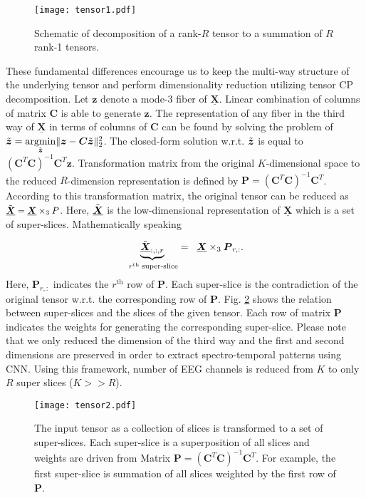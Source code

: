 \documentclass{article}
\begin{document}
\begin{figure}[b]
\vspace{-2mm}
\centerline{\texttt{[image: tensor1.pdf]}}
\caption{\small{Schematic of decomposition of a rank-$R$ tensor to a summation of $R$ rank-1 tensors.}}
\label{fig:tensor11}
\vspace{-3mm}
\end{figure}
These fundamental differences encourage us to keep the multi-way structure of the underlying tensor and perform  dimensionality reduction utilizing tensor CP decomposition. Let $\boldsymbol{z}$ denote a mode-3 fiber  of $\underline{\boldsymbol{X}}$. Linear combination of columns of matrix $\boldsymbol{C}$ is able to generate $\boldsymbol{z}$.  
The  representation of any fiber in the third way of $\underline{\boldsymbol{X}}$ in terms of columns of $\boldsymbol{C}$ can be found by solving the 
problem of
   $\Tilde{\boldsymbol{z}}=\underset{\Tilde{\boldsymbol{z}}}{\text{argmin}}\|\boldsymbol{z}-\boldsymbol{C}\Tilde{\boldsymbol{z}}\|_2^2$.
The closed-form solution w.r.t. $\Tilde{\boldsymbol{z}}$ is equal to $(\boldsymbol{C}^T\boldsymbol{C})^{-1}\boldsymbol{C}^T\boldsymbol{z}$. 
Transformation matrix from the original $K$-dimensional space to the reduced $R$-dimension representation is defined by $\boldsymbol{P}=(\boldsymbol{C}^T\boldsymbol{C})^{-1}\boldsymbol{C}^T$. According to this transformation matrix, the original tensor can be reduced as
 $\small{\Tilde{\boldsymbol{\underline{X}}}=\underline{\boldsymbol{X}}\times_3 P}$.
Here, $\Tilde{\boldsymbol{\underline{X}}}$ is the low-dimensional representation of $\boldsymbol{\underline{X}}$ which is a set of super-slices. Mathematically speaking


 $$\underbrace{\Tilde{\underline{\boldsymbol{X}}}_{:,:,r}}_{\;r^{\text{th}} \;\text{super-slice}}=\;\;\underline{\boldsymbol{\boldsymbol{X}}}\times_3 \boldsymbol{P}_{r,:}. $$ 
Here, $\boldsymbol{P}_{r,:}$ indicates the $r^{\text{th}}$ row of $\boldsymbol{P}$. Each super-slice is the contradiction of the original tensor w.r.t. the corresponding row of $ \boldsymbol{P}$.  Fig. \ref{fig:tensor22} shows the relation between super-slices and the slices of the given tensor. Each row of matrix $\boldsymbol{P}$ indicates the weights for generating the corresponding super-slice. Please note that we only reduced the dimension of the third way and the first and second dimensions are preserved in order to extract spectro-temporal patterns using CNN. Using this framework, number of EEG channels is reduced from $K$ to only $R$ super slices ($K>>R$).
\begin{figure}[h]
\centerline{\texttt{[image: tensor2.pdf]}}
\vspace{-3mm}
\caption{\small{The input tensor as a collection of slices is transformed to a set of super-slices. Each super-slice is a superposition of all slices and weights are driven from Matrix $\boldsymbol{P}=(\boldsymbol{C}^T\boldsymbol{C})^{-1}\boldsymbol{C}^T$. For example, the first super-slice is summation of all slices weighted by the first row of $\boldsymbol{P}$.}}
\label{fig:tensor22}
\vspace{-6mm}
\end{figure}
\end{document}
